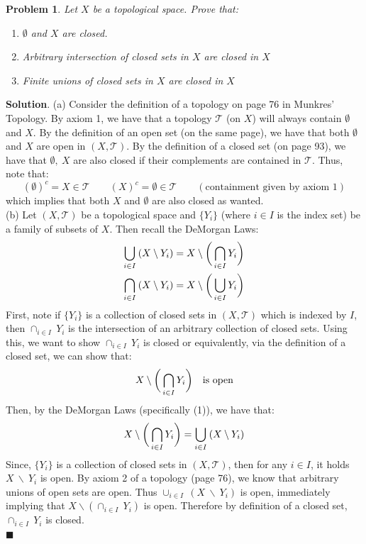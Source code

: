 \documentclass[12pt]{article}
\renewcommand{\=}[1]{\stackrel{#1}{=}} %
\providecommand{\T}{\mathcal{T}}
\newtheorem{p}{Problem}[section]
\theoremstyle{definition}
\newenvironment{s}{%
        \begin{trivlist} \item \textbf{Solution}. }{%
            \hspace*{\fill} $\blacksquare$\end{trivlist}}%
\begin{document}
\newpage
\begin{p}
    Let $X$ be a topological space. Prove that:
    \begin{enumerate}
        \item $\emptyset$ and $X$ are closed.
        \item Arbitrary intersection of closed sets in $X$ are closed in $X$
        \item Finite unions of closed sets in $X$ are closed in $X$
    \end{enumerate}
\end{p}
\begin{s}
    (a) Consider the definition of a topology on page 76 in Munkres' Topology. By axiom 1, we have that a topology $\T$ (on $X$) will
    always contain $\emptyset$ and $X$. By the definition of an open set (on the same page), we have that both
    $\emptyset$ and $X$ are open in $(X,\T)$.
    By the definition of a closed set (on page 93), we have that $\emptyset,\:X$ are also
    closed if their complements are contained in $\T$. Thus, note that:
    \[ (\emptyset)^{c} = X\in\T \qquad (X)^{c} = \emptyset\in\T\qquad(\text{containment given by axiom 1}) \]
    which implies that both $X$ and $\emptyset$ are also closed as wanted. \\

    (b) Let $(X,\T)$ be a topological space and $\{Y_i\}$ (where $i\in I$ is the index set) be a family of subsets of $X$. Then recall the DeMorgan Laws:
    \begin{align}
        \bigcup_{i\in I}\: (X\:\backslash\: Y_i) = X\:\backslash\:\bigg{(}\bigcap_{i\in I} Y_i\bigg{)} \\ \bigcap_{i\in I}\: (X\:\backslash\: Y_i) = X\:\backslash\:
        \bigg{(}\bigcup_{i\in I} Y_i\bigg{)}
    \end{align}
    First, note if $\{Y_i\}$ is a collection of closed sets in $(X,\T)$ which is indexed by $I$, then $\cap_{i\in I}\:Y_i$ is the intersection of an arbitrary collection
    of closed sets. Using this, we want to show $\cap_{i\in I}\: Y_i$ is closed or equivalently, via the definition of a closed set, we can show that:
    \[ X\:\backslash\:\bigg{(}\bigcap_{i\in I} Y_i\bigg{)} \quad \text{is open} \]
    Then, by the DeMorgan Laws (specifically (1)), we have that:
    \[ X\:\backslash\:\bigg{(}\bigcap_{i\in I} Y_i\bigg{)} = \bigcup_{i\in I}\:(X\:\backslash\:Y_i) \]
    Since, $\{Y_i\}$ is a collection of closed sets in $(X,\T)$, then for any $i\in I$, it holds $X\:\backslash\:Y_i$ is open. By axiom 2 of
    a topology (page 76), we know that arbitrary unions of open sets are open. Thus $\cup_{i\in I}\: (X\:\backslash\: Y_i)$ is open,
    immediately implying that $X\backslash(\cap_{i\in I}\: Y_i)$ is open. Therefore by definition of a closed set, $\cap_{i\in I}\: Y_i$ is closed. \\


\end{s}
\end{document}

